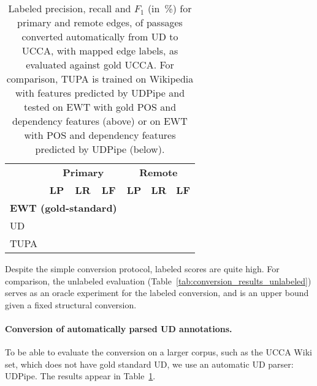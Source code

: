 \documentclass[11pt,a4paper]{article}
\begin{document}
\begin{table}[t]
\centering
\begin{tabular}{l|lll|lll}
& \multicolumn{3}{c|}{\footnotesize \bf Primary} & \multicolumn{3}{c}{\footnotesize \bf Remote} \\
& \footnotesize \textbf{LP} & \footnotesize \textbf{LR} & \footnotesize \textbf{LF}
& \footnotesize \textbf{LP} & \footnotesize \textbf{LR} & \footnotesize \textbf{LF} \\
\hline
\multicolumn{4}{l|}{\small \bf EWT (gold-standard)} & \\
\footnotesize UD
&  \\
\footnotesize TUPA
&  \\
\end{tabular}
\caption{
Labeled precision, recall and $F_1$ (in~\%) for primary and remote edges,
of passages converted automatically from UD to UCCA,
with mapped edge labels, as evaluated against gold UCCA.
For comparison, TUPA \protect\cite{hershcovich2017a} is trained on Wikipedia with features predicted by UDPipe
and tested on EWT with gold POS and dependency features (above)
or on EWT with POS and dependency features predicted by UDPipe (below).
\label{tab:conversion_results_labeled}}
\end{table}

Despite the simple conversion protocol, labeled scores are quite high.
For comparison, the unlabeled evaluation (Table~\ref{tab:conversion_results_unlabeled})
serves as an oracle experiment for the labeled conversion,
and is an upper bound given a fixed structural conversion.

\paragraph{Conversion of automatically parsed UD annotations.}

To be able to evaluate the conversion on a larger corpus,
such as the UCCA Wiki set, which does not have gold standard UD,
we use an automatic UD parser: UDPipe.
The results appear in Table~\ref{tab:conversion_results_labeled}.
\end{document}
